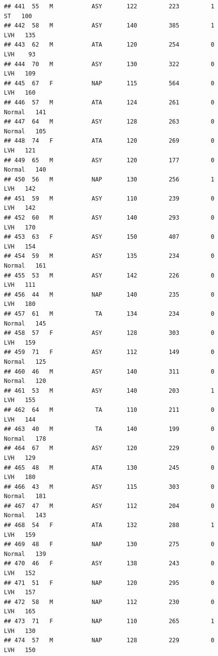 \documentclass[
]{article}
\begin{document}
\begin{verbatim}
## 441  55   M           ASY       122         223         1         ST   100
## 442  58   M           ASY       140         385         1        LVH   135
## 443  62   M           ATA       120         254         0        LVH    93
## 444  70   M           ASY       130         322         0        LVH   109
## 445  67   F           NAP       115         564         0        LVH   160
## 446  57   M           ATA       124         261         0     Normal   141
## 447  64   M           ASY       128         263         0     Normal   105
## 448  74   F           ATA       120         269         0        LVH   121
## 449  65   M           ASY       120         177         0     Normal   140
## 450  56   M           NAP       130         256         1        LVH   142
## 451  59   M           ASY       110         239         0        LVH   142
## 452  60   M           ASY       140         293         0        LVH   170
## 453  63   F           ASY       150         407         0        LVH   154
## 454  59   M           ASY       135         234         0     Normal   161
## 455  53   M           ASY       142         226         0        LVH   111
## 456  44   M           NAP       140         235         0        LVH   180
## 457  61   M            TA       134         234         0     Normal   145
## 458  57   F           ASY       128         303         0        LVH   159
## 459  71   F           ASY       112         149         0     Normal   125
## 460  46   M           ASY       140         311         0     Normal   120
## 461  53   M           ASY       140         203         1        LVH   155
## 462  64   M            TA       110         211         0        LVH   144
## 463  40   M            TA       140         199         0     Normal   178
## 464  67   M           ASY       120         229         0        LVH   129
## 465  48   M           ATA       130         245         0        LVH   180
## 466  43   M           ASY       115         303         0     Normal   181
## 467  47   M           ASY       112         204         0     Normal   143
## 468  54   F           ATA       132         288         1        LVH   159
## 469  48   F           NAP       130         275         0     Normal   139
## 470  46   F           ASY       138         243         0        LVH   152
## 471  51   F           NAP       120         295         0        LVH   157
## 472  58   M           NAP       112         230         0        LVH   165
## 473  71   F           NAP       110         265         1        LVH   130
## 474  57   M           NAP       128         229         0        LVH   150

\end{verbatim}
\end{document}
